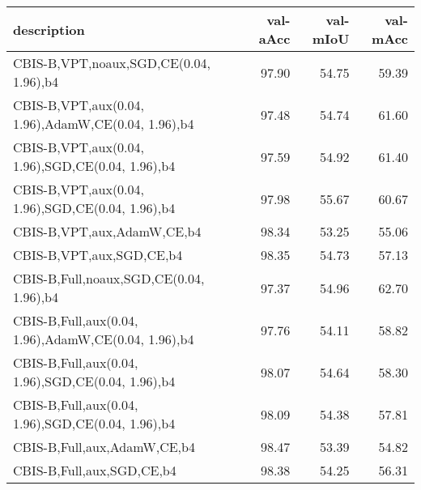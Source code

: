 \begin{tabular}{lrrr}
\toprule
description & val-aAcc & val-mIoU & val-mAcc \\
\midrule
CBIS-B,VPT,noaux,SGD,CE(0.04, 1.96),b4 & 97.90 & 54.75 & 59.39 \\
CBIS-B,VPT,aux(0.04, 1.96),AdamW,CE(0.04, 1.96),b4 & 97.48 & 54.74 & 61.60 \\
CBIS-B,VPT,aux(0.04, 1.96),SGD,CE(0.04, 1.96),b4 & 97.59 & 54.92 & 61.40 \\
CBIS-B,VPT,aux(0.04, 1.96),SGD,CE(0.04, 1.96),b4 & 97.98 & 55.67 & 60.67 \\
CBIS-B,VPT,aux,AdamW,CE,b4 & 98.34 & 53.25 & 55.06 \\
CBIS-B,VPT,aux,SGD,CE,b4 & 98.35 & 54.73 & 57.13 \\
CBIS-B,Full,noaux,SGD,CE(0.04, 1.96),b4 & 97.37 & 54.96 & 62.70 \\
CBIS-B,Full,aux(0.04, 1.96),AdamW,CE(0.04, 1.96),b4 & 97.76 & 54.11 & 58.82 \\
CBIS-B,Full,aux(0.04, 1.96),SGD,CE(0.04, 1.96),b4 & 98.07 & 54.64 & 58.30 \\
CBIS-B,Full,aux(0.04, 1.96),SGD,CE(0.04, 1.96),b4 & 98.09 & 54.38 & 57.81 \\
CBIS-B,Full,aux,AdamW,CE,b4 & 98.47 & 53.39 & 54.82 \\
CBIS-B,Full,aux,SGD,CE,b4 & 98.38 & 54.25 & 56.31 \\
\bottomrule
\end{tabular}
